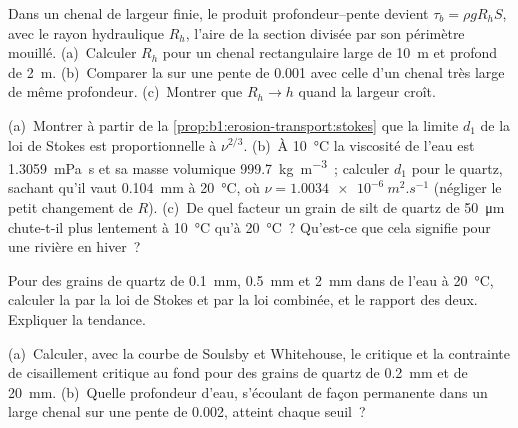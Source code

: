 \begin{exercise}[$\star\star$]\label{exo:b1:erosion-transport:5}
Dans un chenal de largeur finie, le produit profondeur--pente devient $\tau_b =
\rho g R_h S$, avec le rayon hydraulique $R_h$, l'aire de la section
divisée par son périmètre mouillé. (a)~Calculer $R_h$ pour un chenal rectangulaire
large de \qty{10}{m} et profond de \qty{2}{m}. (b)~Comparer la  sur une
pente de \num{0.001} avec celle d'un chenal très large de même profondeur.
(c)~Montrer que $R_h \to h$ quand la largeur croît.
\end{exercise}

\begin{exercise}[$\star\star$]\label{exo:b1:erosion-transport:6}
(a)~Montrer à partir de la \cref{prop:b1:erosion-transport:stokes} que la limite $d_1$ de
la loi de Stokes est proportionnelle à $\nu^{2/3}$. (b)~À \qty{10}{\celsius} la
viscosité de l'eau est \qty{1.3059}{mPa.s} et sa masse volumique
\qty{999.7}{kg.m^{-3}}~; calculer $d_1$ pour le quartz, sachant qu'il vaut
\qty{0.104}{mm} à \qty{20}{\celsius}, où $\nu = \qty{1.0034e-6}{m^2.s^{-1}}$
(négliger le petit changement de $R$). (c)~De quel facteur un grain de silt de quartz
de \qty{50}{\micro m} chute-t-il plus lentement à \qty{10}{\celsius} qu'à
\qty{20}{\celsius}~? Qu'est-ce que cela signifie pour une rivière en hiver~?
\end{exercise}

\begin{exercise}[$\star\star$]\label{exo:b1:erosion-transport:7}
Pour des grains de quartz de \qty{0.1}{mm}, \qty{0.5}{mm} et \qty{2}{mm} dans de l'eau à
\qty{20}{\celsius}, calculer la  par la loi de Stokes et par la
loi combinée, et le rapport des deux. Expliquer la tendance.
\end{exercise}

\begin{exercise}[$\star\star$]\label{exo:b1:erosion-transport:8}
(a)~Calculer, avec la courbe de Soulsby et Whitehouse, le  critique et la
contrainte de cisaillement critique au fond pour des grains de quartz de \qty{0.2}{mm} et de
\qty{20}{mm}. (b)~Quelle profondeur d'eau, s'écoulant de façon permanente dans un large chenal sur une
pente de \num{0.002}, atteint chaque seuil~?
\end{exercise}


